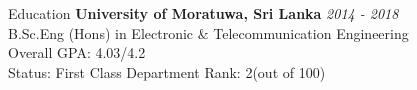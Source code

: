 \documentclass[
	11pt, %
]{./assets/resume} %
\begin{document}

\begin{rSection}{Education}
	\textbf{University of Moratuwa, Sri Lanka} \hfill \textit{2014 - 2018} \\
	B.Sc.Eng (Hons) in Electronic \& Telecommunication Engineering \\
	Overall GPA: 4.03/4.2 \\
	Status: First Class
        Department Rank: 2(out of 100)

\end{rSection}

\end{document}
